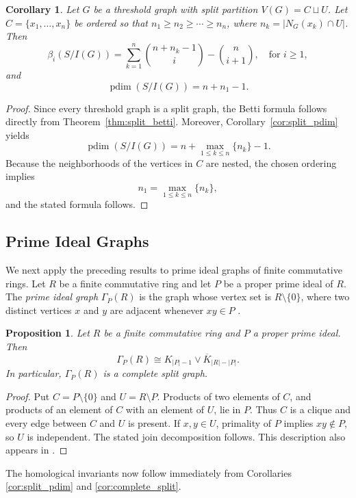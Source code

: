 \documentclass[12pt, reqno]{amsart}
\newtheorem{corollary}[theorem]{Corollary}
\newtheorem{proposition}[theorem]{Proposition}
\theoremstyle{definition}
\numberwithin{equation}{section}
\begin{document}
	\begin{corollary}
		Let $G$ be a threshold graph with split partition $V(G)=C\sqcup U$. Let $C=\{x_1,\ldots,x_n\}$ be ordered so that $n_1\ge n_2\ge \cdots \ge n_n$, where $n_k=|N_G(x_k)\cap U|$. Then
		\[
		\beta_i(S/I(G)) = \sum_{k=1}^{n} \binom{n+n_k-1}{i} - \binom{n}{i+1}, \quad \text{for } i \ge1,
		\]
		and
		\[
		\operatorname{pdim}(S/I(G)) = n+n_1-1.
		\]
	\end{corollary}
	\begin{proof}
		Since every threshold graph is a split graph, the Betti formula follows directly from Theorem~\ref{thm:split_betti}. Moreover, Corollary~\ref{cor:split_pdim} yields
		\[
		\operatorname{pdim}(S/I(G)) = n+\max_{1\le k\le n}\{n_k\}-1.
		\]
		Because the neighborhoods of the vertices in $C$ are nested, the chosen ordering implies
		\[
		n_1=\max_{1\le k\le n}\{n_k\},
		\]
		and the stated formula follows.
	\end{proof}
	
	\subsection{Prime Ideal Graphs}
	
	We next apply the preceding results to prime ideal graphs of finite commutative rings. Let $R$ be a finite commutative ring and let $P$ be a proper prime ideal of $R$. The \emph{prime ideal graph} $\Gamma_P(R)$ is the graph whose vertex set is $R\setminus\{0\}$, where two distinct vertices $x$ and $y$ are adjacent whenever $xy\in P$ \cite{salih2022,rasheed2026}.
	
	\begin{proposition}\label{prop:pig_complete_split}
Let $R$ be a finite commutative ring and $P$ a proper prime ideal.  Then
\[
\Gamma_P(R)\cong K_{|P|-1}\vee\overline K_{|R|-|P|}.
\]
In particular, $\Gamma_P(R)$ is a complete split graph.
\end{proposition}
\begin{proof}
Put $C=P\setminus\{0\}$ and $U=R\setminus P$.  Products of two elements of $C$, and products of an element of $C$ with an element of $U$, lie in $P$.  Thus $C$ is a clique and every edge between $C$ and $U$ is present.  If $x,y\in U$, primality of $P$ implies $xy\notin P$, so $U$ is independent.  The stated join decomposition follows.  This description also appears in \cite{rasheed2026}.
\end{proof}
	
	The homological invariants now follow immediately from Corollaries \ref{cor:split_pdim} and \ref{cor:complete_split}.
	
\end{document}

